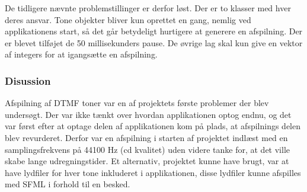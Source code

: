 De tidligere nævnte problemstillinger er derfor løst. Der er to klasser med hver deres ansvar. Tone objekter bliver kun oprettet en gang, nemlig ved applikationens start, så det går betydeligt hurtigere at generere en afspilning. Der er blevet tilføjet de 50 millisekunders pause. De øvrige lag skal kun give en vektor af integers for at igangsætte en afspilning.

\subsubsection{Disussion}
Afspilning af DTMF toner var en af projektets første problemer der blev undersøgt. Der var ikke tænkt over hvordan applikationen optog endnu, og det var først efter at optage delen af applikationen kom på plads, at afspilnings delen blev revurderet. Derfor var en afspilning i starten af projektet indlæst med en samplingsfrekvens på 44100 Hz (cd kvalitet) uden videre tanke for, at det ville skabe lange udregningstider. Et alternativ, projektet kunne have brugt, var at have lydfiler for hver tone inkluderet i applikationen, disse lydfiler kunne afspilles med SFML i forhold til en besked.